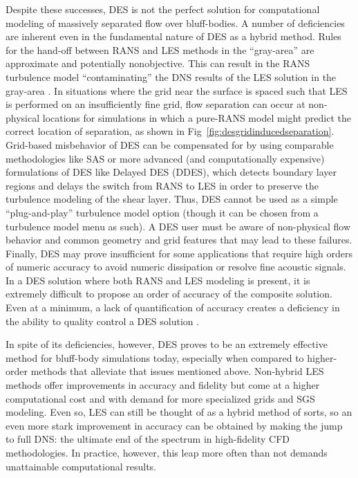 \documentclass[journal]{new-aiaa}
\begin{document}
Despite these successes, DES is not the perfect solution for computational modeling of massively separated flow over bluff-bodies. A number of deficiencies are inherent even in the fundamental nature of DES as a hybrid method. Rules for the hand-off between RANS and LES methods in the ``gray-area'' are approximate and potentially nonobjective. This can result in the RANS turbulence model ``contaminating'' the DNS results of the LES solution in the gray-area \cite{spalart2009detachededdy}. In situations where the grid near the surface is spaced such that LES is performed on an insufficiently fine grid, flow separation can occur at non-physical locations for simulations in which a pure-RANS model might predict the correct location of separation, as shown in Fig~\ref{fig:desgridinducedseparation}. Grid-based misbehavior of DES can be compensated for by using comparable methodologies like SAS or more advanced (and computationally expensive) formulations of DES like Delayed DES (DDES), which detects boundary layer regions and delays the switch from RANS to LES in order to preserve the turbulence modeling of the shear layer. Thus, DES cannot be used as a simple ``plug-and-play'' turbulence model option (though it can be chosen from a turbulence model menu as such). A DES user must be aware of non-physical flow behavior and common geometry and grid features that may lead to these failures. Finally, DES may prove insufficient for some applications that require high orders of numeric accuracy to avoid numeric dissipation or resolve fine acoustic signals. In a DES solution where both RANS and LES modeling is present, it is extremely difficult to propose an order of accuracy of the composite solution. Even at a minimum, a lack of quantification of accuracy creates a deficiency in the ability to quality control a DES solution \cite{spalart2009detachededdy}.



In spite of its deficiencies, however, DES proves to be an extremely effective method for bluff-body simulations today, especially when compared to higher-order methods that alleviate that issues mentioned above. Non-hybrid LES methods offer improvements in accuracy and fidelity but come at a higher computational cost and with demand for more specialized grids and SGS modeling. Even so, LES can still be thought of as a hybrid method of sorts, so an even more stark improvement in accuracy can be obtained by making the jump to full DNS: the ultimate end of the spectrum in high-fidelity CFD methodologies. In practice, however, this leap more often than not demands unattainable computational results.
\end{document}
